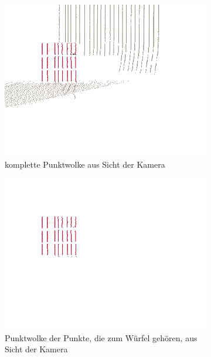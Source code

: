 \documentclass[ngerman,a4paper,parskip=half]{scrartcl}
\begin{document}
\begin{figure}[H]
	\centering
	\begin{subfigure}{0.45\textwidth}
		\includegraphics[width=\textwidth,frame]{includes/free_red_cam.png}
		\caption{komplette Punktwolke aus Sicht der Kamera}
	\end{subfigure}
	\hfill
	\begin{subfigure}{0.45\textwidth}
		\includegraphics[width=\textwidth,frame]{includes/free_only_red_cam.png}
		\caption{Punktwolke der Punkte, die zum Würfel gehören, aus Sicht der Kamera}
	\end{subfigure}
	\begin{subfigure}{0.45\textwidth}

\end{subfigure}
\end{figure}
\end{document}
